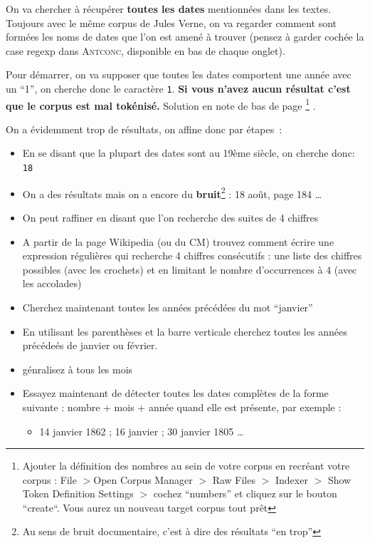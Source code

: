  On va chercher à récupérer \textbf{toutes les dates} mentionnées dans les textes.
 Toujours avec le même corpus de Jules Verne, on va regarder comment sont formées les noms de dates que l'on est amené à trouver (pensez à garder cochée la case regexp dans \textsc{Antconc}, disponible en bas de chaque onglet).

 Pour démarrer, on va supposer que toutes les dates comportent une année avec un  ``1'', on cherche donc le caractère \texttt{1}. \textbf{Si vous n'avez aucun résultat c'est que le corpus est mal tokénisé.} Solution en note de bas de page \footnote{ Ajouter la définition des nombres au sein de votre corpus en recréant votre corpus : 
File $>$Open Corpus Manager $>$ Raw Files $>$ Indexer $>$ Show Token Definition Settings $>$ cochez ``numbers'' et cliquez sur le bouton ``create``. Vous aurez un nouveau target corpus tout prêt}
.

 On a évidemment trop de résultats, on affine donc par étapes~:
\begin{itemize}
  \item En se disant que la plupart des dates sont au 19ème siècle, on cherche donc: \texttt{18}
  \item On a des résultats mais on a encore du \textbf{bruit}\footnote{Au sens de bruit documentaire, c'est à dire des résultats ``en trop''} : 18 août, page 184 \dots
  \item On peut raffiner en disant que l'on recherche des suites de 4 chiffres 
  \item A partir de la page Wikipedia (ou du CM) trouvez comment écrire une expression régulières qui recherche 4 chiffres consécutifs : une liste des chiffres possibles (avec les crochets) et en limitant le nombre d'occurrences à 4 (avec les accolades)
  \item Cherchez maintenant toutes les années précédées du mot ``janvier''
  \item En utilisant les parenthèses et la barre verticale cherchez toutes les années précédeés de janvier ou février.
  \item génralisez à tous les mois
  \item Essayez maintenant de détecter toutes les dates complètes de la forme suivante : nombre + mois + année quand elle est présente, par exemple :
  \begin{itemize}
    \item 14 janvier 1862 ; 16 janvier ; 30 janvier 1805 \dots
  \end{itemize}
\end{itemize}

